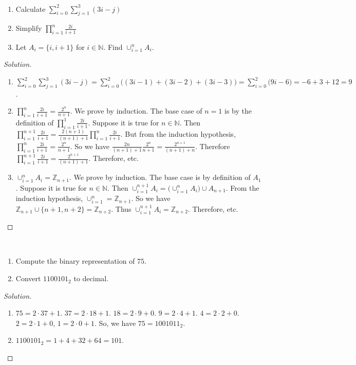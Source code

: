 \documentclass[../main.tex]{subfiles}
\begin{document}
\begin{problem}
\
\begin{enumerate}
\item Calculate $\sum_{i=0}^{2}\sum_{j=1}^{3}(3i-j)$
\item Simplify $\prod_{i=1}^{n} \frac{2i}{i+1}$
\item Let $A_{i} = \{i,i+1\}$ for $i\in \mathbb{N}$. Find $\cup_{i=1}^{n} A_{i}$.
\end{enumerate}
\end{problem}
\begin{proof}[Solution]
\
\begin{enumerate}
\item $\sum_{i=0}^{2}\sum_{j=1}^{3}(3i-j) = \sum_{i=0}^{2}\big((3i-1)+(3i-2)+(3i-3)\big) = \sum_{i=0}^{2}\big(9i-6\big) = -6+3+12 = 9$.
\item $\prod_{i=1}^{n} \frac{2i}{i+1}= \frac{2^n}{n+1}$. We prove by induction. The base case of $n=1$ is by the definition of $\prod_{i=1}^{1}\frac{2i}{i+1}$. Suppose it is true for $n\in \mathbb{N}$. Then $\prod_{i=1}^{n+1} \frac{2i}{i+1} = \frac{2(n+1)}{(n+1)+1}\prod_{i=1}^{n}\frac{2i}{i+1}$. But from the induction hypothesis, $\prod_{i=1}^{n}\frac{2i}{i+1} = \frac{2^n}{n+1}$. So we have $\frac{2n}{(n+1)+1}\frac{2^n}{n+1} = \frac{2^{n+1}}{(n+1)+n}$. Therefore $\prod_{i=1}^{n+1} \frac{2i}{i+1} = \frac{2^{n+1}}{(n+1)+1}$. Therefore, etc.
\item $\cup_{i=1}^{n} A_i = \mathbb{Z}_{n+1}$. We prove by induction. The base case is by definition of $A_1$. Suppose it is true for $n\in \mathbb{N}$. Then $\cup_{i=1}^{n+1}A_i = \big(\cup_{i=1}^{n}A_{i}\big) \cup A_{n+1}$. From the induction hypothesis, $\cup_{i=1}^{n} = \mathbb{Z}_{n+1}$. So we have $\mathbb{Z}_{n+1} \cup \{n+1,n+2\} = \mathbb{Z}_{n+2}$. Thus $\cup_{i=1}^{n+1} A_{i} = \mathbb{Z}_{n+2}$. Therefore, etc.
\end{enumerate}
\end{proof}

\begin{problem}
\
\begin{enumerate}
\item Compute the binary representation of $75$.
\item Convert $1100101_2$ to decimal.
\end{enumerate}
\end{problem}
\begin{proof}[Solution]
\
\begin{enumerate}
\item $75 = 2\cdot 37+1$. $37 = 2\cdot 18+1$. $18 = 2\cdot 9 + 0$. $9 = 2\cdot 4 + 1$. $4 = 2\cdot 2+0$. $2 = 2\cdot 1+0$, $1= 2\cdot 0 + 1$. So, we have $75 = 1001011_2$.
\item $1100101_2 = 1+4+32+64 = 101$.
\end{enumerate}
\end{proof}
\end{document}
